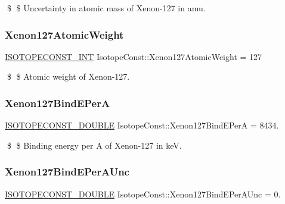 \$ \$ Uncertainty in atomic mass of Xenon-\/127 in amu. \mbox{\label{group___isotope_const-_xenon-_xe127_gaa6476cc6d83dad94252721101f1ec184}} 
\subsubsection{\texorpdfstring{Xenon127\+Atomic\+Weight}{Xenon127AtomicWeight}}
{\footnotesize\ttfamily \mbox{\hyperlink{group___isotope_const-_macros_ga5f18360b3e99483a35c32d789e62621c}{I\+S\+O\+T\+O\+P\+E\+C\+O\+N\+S\+T\+\_\+\+I\+NT}} Isotope\+Const\+::\+Xenon127\+Atomic\+Weight = 127}

\$ \$ Atomic weight of Xenon-\/127. \mbox{\label{group___isotope_const-_xenon-_xe127_ga8acc493b3a0a4b826a310e1b2a5638eb}} 
\subsubsection{\texorpdfstring{Xenon127\+Bind\+E\+PerA}{Xenon127BindEPerA}}
{\footnotesize\ttfamily \mbox{\hyperlink{group___isotope_const-_macros_ga8f45a7272ce02c0b4c65c44636ed719a}{I\+S\+O\+T\+O\+P\+E\+C\+O\+N\+S\+T\+\_\+\+D\+O\+U\+B\+LE}} Isotope\+Const\+::\+Xenon127\+Bind\+E\+PerA = 8434.}

\$ \$ Binding energy per A of Xenon-\/127 in keV. \mbox{\label{group___isotope_const-_xenon-_xe127_gace9015be3bd166a606aec2f107995b57}} 
\subsubsection{\texorpdfstring{Xenon127\+Bind\+E\+Per\+A\+Unc}{Xenon127BindEPerAUnc}}
{\footnotesize\ttfamily \mbox{\hyperlink{group___isotope_const-_macros_ga8f45a7272ce02c0b4c65c44636ed719a}{I\+S\+O\+T\+O\+P\+E\+C\+O\+N\+S\+T\+\_\+\+D\+O\+U\+B\+LE}} Isotope\+Const\+::\+Xenon127\+Bind\+E\+Per\+A\+Unc = 0.}

